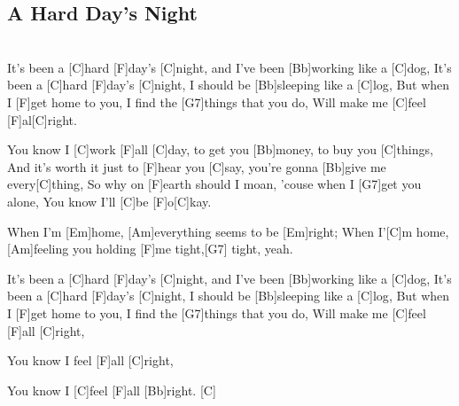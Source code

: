 \subsection{A Hard Day's Night}

\begin{guitar}
\\
It's been a [C]{hard} [F]{day's} [C]{night}, and I've been [Bb]{work}ing like a [C]{dog},
It's been a [C]{hard} [F]{day's} [C]{night}, I should be [Bb]{sleep}ing like a [C]{log},
But when I [F]{get} home to you, I find the [G7]{things} that you do, 
Will make me [C]{feel} [F]{al}[C]{right}.


You know I [C]{work} [F]{all} [C]{day}, to get you [Bb]{mon}ey, to buy you [C]{things},
And it's worth it just to [F]{hear} you [C]{say}, you're gonna [Bb]{give} me every[C]{thing},
So why on [F]{earth} should I moan, 'couse when I [G7]{get} you alone, 
You know I'll [C]{be} [F]{o}[C]{kay}.


When I'm [Em]{home},  [Am]everything seems to be [Em]{right};
When I'[C]{m} home, [Am]feeling you holding [F]{me} tight,[G7]{ }tight, yeah.


It's been a [C]{hard} [F]{day's} [C]{night}, and I've been [Bb]{work}ing like a [C]{dog},
It's been a [C]{hard} [F]{day's} [C]{night}, I should be [Bb]{sleep}ing like a [C]{log},
But when I [F]{get} home to you, I find the [G7]{things} that you do,
Will make me [C]{feel} [F]{all} [C]{right},


You know I feel [F]{all} [C]{right},


You know I [C]{feel} [F]{all} [Bb]{right}.      [C]{}

\end{guitar}